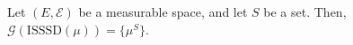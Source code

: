 \begin{lemma}
    \label{lem:gibbs-measure-existence}
    \lean{}
    Let $(E,\mathcal{E})$ be a measurable space, and let $S$ be a set. Then, $\mathcal{G}(\text{ISSSD}(\mu))=\{\mu^S\}$.
\end{lemma}
